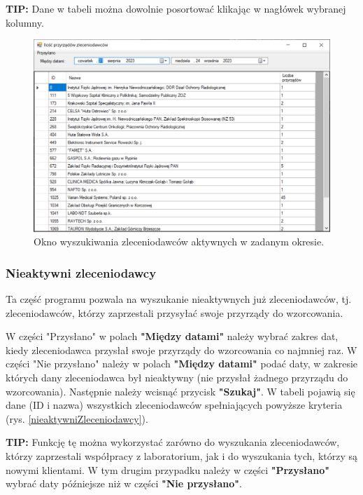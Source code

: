 \textbf{TIP:} Dane w tabeli można dowolnie posortować klikając w nagłówek wybranej kolumny.

\begin{figure}[htb]
	\centering
	\includegraphics[width=\columnwidth]{obrazki/Wyszukiwanie/Zleceniodawcy/ilosc_przyrzadow_zleceniodawcow.png}
	\caption{Okno wyszukiwania zleceniodawców aktywnych w zadanym okresie.}
	\label{aktywniZleceniodawcy}
\end{figure}

\subsubsection{Nieaktywni zleceniodawcy}
\label{sort_nieprzysylajacych}

Ta część programu pozwala na wyszukanie nieaktywnych już zleceniodawców, tj. zleceniodawców, którzy zaprzestali przysyłać swoje przyrządy do wzorcowania.

W części "Przysłano" w polach \textbf{"Między datami"} należy wybrać zakres dat, kiedy zleceniodawca przysłał swoje przyrządy do wzorcowania co najmniej raz. W części "Nie przysłano" należy w polach \textbf{"Między datami"} podać daty, w zakresie których dany zleceniodawca był nieaktywny (nie przysłał żadnego przyrządu do wzorcowania). Następnie należy wcisnąć przycisk \textbf{"Szukaj"}. W tabeli pojawią się dane (ID i nazwa) wszystkich zleceniodawców spełniających powyższe kryteria (rys. \ref{nieaktywniZleceniodawcy}).

\textbf{TIP:} Funkcję tę można wykorzystać zarówno do wyszukania zleceniodawców, którzy zaprzestali współpracy z laboratorium, jak i do wyszukania tych, którzy są nowymi klientami. W tym drugim przypadku należy w części \textbf{"Przysłano"} wybrać daty późniejsze niż w części \textbf{"Nie przysłano"}.

